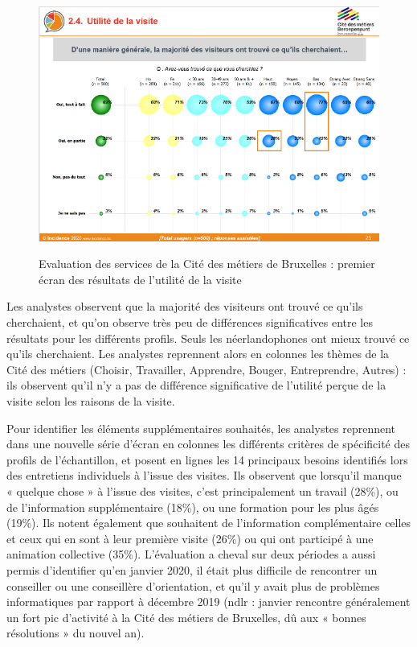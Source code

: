 \documentclass[french,a4paper,12pt]{article}
\begin{document}
{\begin{center}
\begin{figure}
\includegraphics[scale=1.5]{9-cdm-utilite.PNG}
\end{figure}
\begin{figure}[h]
\caption{Evaluation des services de la Cité des métiers de Bruxelles : premier écran des résultats de l'utilité de la visite}
\end{figure}
\end{center}

\quad Les analystes observent que la majorité des visiteurs ont trouvé ce qu’ils cherchaient, et qu’on observe très peu de différences significatives entre les résultats pour les différents profils. Seuls les néerlandophones ont mieux trouvé ce qu’ils cherchaient. Les analystes reprennent alors en colonnes les thèmes de la Cité des métiers (Choisir, Travailler, Apprendre, Bouger, Entreprendre, Autres) : ils observent qu’il n’y a pas de différence significative de l’utilité perçue de la visite selon les raisons de la visite. 

\quad Pour identifier les éléments supplémentaires souhaités, les analystes reprennent dans une nouvelle série d’écran en colonnes les différents critères de spécificité des profils de l’échantillon, et posent en lignes les 14 principaux besoins identifiés lors des entretiens individuels à l’issue des visites. Ils observent que lorsqu’il manque « quelque chose » à l’issue des visites, c’est principalement un travail (28\%), ou de l’information supplémentaire (18\%), ou une formation pour les plus âgés (19\%). Ils notent également que souhaitent de l’information complémentaire celles et ceux qui en sont à leur première visite (26\%) ou qui ont participé à une animation collective (35\%). L’évaluation a cheval sur deux périodes a aussi permis d’identifier qu’en janvier 2020, il était plus difficile de rencontrer un conseiller ou une conseillère d’orientation, et qu’il y avait plus de problèmes informatiques par rapport à décembre 2019 (ndlr : janvier rencontre généralement un fort pic d’activité à la Cité des métiers de Bruxelles, dû aux « bonnes résolutions » du nouvel an).

}
\end{document}
